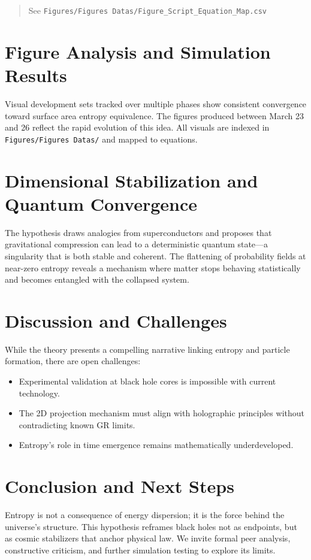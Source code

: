 \documentclass[12pt]{article}
\begin{document}
\begin{quote}
See \texttt{Figures/Figures~Datas/Figure\_Script\_Equation\_Map.csv}
\end{quote}

\section{Figure Analysis and Simulation Results}
Visual development sets tracked over multiple phases show consistent convergence toward surface area entropy equivalence. The figures produced between March 23 and 26 reflect the rapid evolution of this idea. All visuals are indexed in \texttt{Figures/Figures Datas/} and mapped to equations.

\section{Dimensional Stabilization and Quantum Convergence}
The hypothesis draws analogies from superconductors and proposes that gravitational compression can lead to a deterministic quantum state—a singularity that is both stable and coherent. The flattening of probability fields at near-zero entropy reveals a mechanism where matter stops behaving statistically and becomes entangled with the collapsed system.

\section{Discussion and Challenges}

While the theory presents a compelling narrative linking entropy and particle formation, there are open challenges:

\begin{itemize}
    \item Experimental validation at black hole cores is impossible with current technology.
    \item The 2D projection mechanism must align with holographic principles without contradicting known GR limits.
    \item Entropy's role in time emergence remains mathematically underdeveloped.
\end{itemize}

\section{Conclusion and Next Steps}

Entropy is not a consequence of energy dispersion; it is the force behind the universe's structure. This hypothesis reframes black holes not as endpoints, but as cosmic stabilizers that anchor physical law. We invite formal peer analysis, constructive criticism, and further simulation testing to explore its limits.
\end{document}
